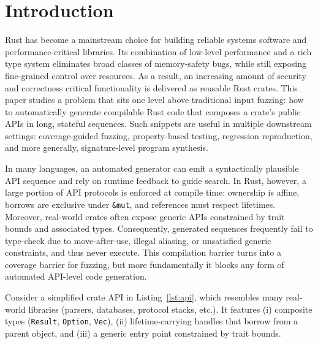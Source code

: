 \documentclass[sigconf]{acmart}
\begin{document}


\maketitle

\section{Introduction}
Rust has become a mainstream choice for building reliable systems software and performance-critical libraries.
Its combination of low-level performance and a rich type system eliminates broad classes of memory-safety bugs,
while still exposing fine-grained control over resources.
As a result, an increasing amount of security and correctness critical functionality is delivered as reusable Rust crates. This paper studies a problem that sits one level above traditional input fuzzing: how to automatically generate compilable Rust code that composes a crate's public APIs in long, stateful sequences.
Such snippets are useful in multiple downstream settings:
coverage-guided fuzzing, property-based testing, regression reproduction, and more generally, signature-level program synthesis.

In many languages, an automated generator can emit a syntactically plausible API sequence and rely on runtime feedback to guide search. In Rust, however, a large portion of API protocols is enforced at compile time: ownership is affine, borrows are exclusive under \texttt{\&mut}, and references must respect lifetimes. Moreover, real-world crates often expose generic APIs constrained by trait bounds and associated types. Consequently, generated sequences frequently fail to type-check due to move-after-use, illegal aliasing, or unsatisfied generic constraints, and thus never execute. This compilation barrier turns into a coverage barrier for fuzzing, but more fundamentally it blocks any form of automated API-level code generation.

Consider a simplified crate API in Listing~\ref{lst:api}, which resembles many real-world libraries (parsers, databases, protocol stacks, etc.). It features (i) composite types (\texttt{Result}, \texttt{Option}, \texttt{Vec}), (ii) lifetime-carrying handles that borrow from a parent object, and (iii) a generic entry point constrained by trait bounds.
\end{document}
